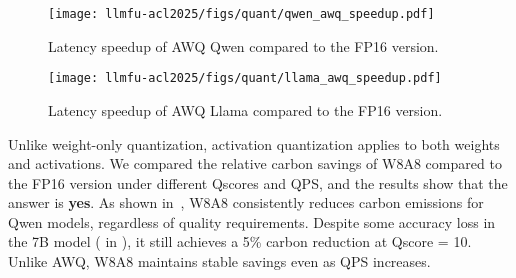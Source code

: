 \begin{figure}[!t]
    \centering
    \texttt{[image: llmfu-acl2025/figs/quant/qwen\_awq\_speedup.pdf]}
    \vspace{-0.15in}
    \caption{Latency speedup of AWQ Qwen compared to the FP16 version.}
    \label{fig:quant_speedup_qwen}
\end{figure}

\begin{figure}[!t]
    \centering
    \texttt{[image: llmfu-acl2025/figs/quant/llama\_awq\_speedup.pdf]}
    \vspace{-0.15in}
    \caption{Latency speedup of AWQ Llama compared to the FP16 version.}
    \label{fig:quant_speedup_llama}
\end{figure}









\noindent Unlike weight-only quantization, activation quantization applies to both weights and activations. We compared the relative carbon savings of W8A8 compared to the FP16 version under different Qscores and QPS, and the results show that the answer is \textbf{yes}. As shown in~, W8A8 consistently reduces carbon emissions for Qwen models, regardless of quality requirements. Despite some accuracy loss in the 7B model ( in ), it still achieves a 5\% carbon reduction at Qscore = 10. Unlike AWQ, W8A8 maintains stable savings even as QPS increases.


